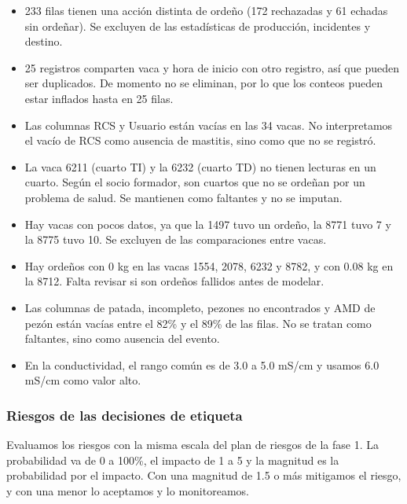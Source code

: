\begin{itemize}
  \item 233 filas tienen una acción distinta de ordeño (172 rechazadas y 61 echadas sin ordeñar). Se excluyen de las estadísticas de producción, incidentes y destino.
  \item 25 registros comparten vaca y hora de inicio con otro registro, así que pueden ser duplicados. De momento no se eliminan, por lo que los conteos pueden estar inflados hasta en 25 filas.
  \item Las columnas RCS y Usuario están vacías en las 34 vacas. No interpretamos el vacío de RCS como ausencia de mastitis, sino como que no se registró.
  \item La vaca 6211 (cuarto TI) y la 6232 (cuarto TD) no tienen lecturas en un cuarto. Según el socio formador, son cuartos que no se ordeñan por un problema de salud. Se mantienen como faltantes y no se imputan.
  \item Hay vacas con pocos datos, ya que la 1497 tuvo un ordeño, la 8771 tuvo 7 y la 8775 tuvo 10. Se excluyen de las comparaciones entre vacas.
  \item Hay ordeños con 0 kg en las vacas 1554, 2078, 6232 y 8782, y con 0.08 kg en la 8712. Falta revisar si son ordeños fallidos antes de modelar.
  \item Las columnas de patada, incompleto, pezones no encontrados y AMD de pezón están vacías entre el 82\% y el 89\% de las filas. No se tratan como faltantes, sino como ausencia del evento.
  \item En la conductividad, el rango común es de 3.0 a 5.0 mS/cm y usamos 6.0 mS/cm como valor alto.
\end{itemize}

\subsubsection*{Riesgos de las decisiones de etiqueta}

Evaluamos los riesgos con la misma escala del plan de riesgos de la fase 1. La probabilidad va de 0 a 100\%, el impacto de 1 a 5 y la magnitud es la probabilidad por el impacto. Con una magnitud de 1.5 o más mitigamos el riesgo, y con una menor lo aceptamos y lo monitoreamos.

